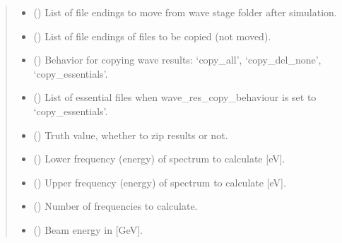 \documentclass[letterpaper,10pt,english]{sphinxmanual}
\begin{document}
\begin{fulllineitems}
\begin{fulllineitems}
\begin{quote}
\begin{description}
\begin{itemize}
\item {} 
\sphinxAtStartPar
{} () \textendash{} List of file endings to move from wave stage folder after simulation.

\item {} 
\sphinxAtStartPar
{} () \textendash{} List of file endings of files to be copied (not moved).

\item {} 
\sphinxAtStartPar
{} () \textendash{} Behavior for copying wave results: ‘copy\_all’, ‘copy\_del\_none’, ‘copy\_essentials’.

\item {} 
\sphinxAtStartPar
{} () \textendash{} List of essential files when wave\_res\_copy\_behaviour is set to ‘copy\_essentials’.

\item {} 
\sphinxAtStartPar
{} () \textendash{} Truth value, whether to zip results or not.

\item {} 
\sphinxAtStartPar
{} () \textendash{} Lower frequency (energy) of spectrum to calculate {[}eV{]}.

\item {} 
\sphinxAtStartPar
{} () \textendash{} Upper frequency (energy) of spectrum to calculate {[}eV{]}.

\item {} 
\sphinxAtStartPar
{} () \textendash{} Number of frequencies to calculate.

\item {} 
\sphinxAtStartPar
{} () \textendash{} Beam energy in {[}GeV{]}.


\end{itemize}
\end{description}
\end{quote}
\end{fulllineitems}
\end{fulllineitems}
\end{document}

